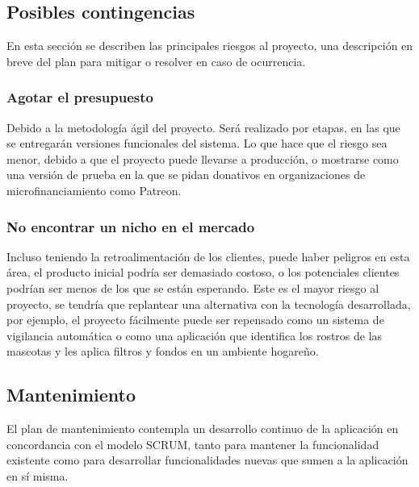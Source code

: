 \subsection{Posibles contingencias}

En esta sección se describen las principales riesgos al proyecto, una descripción en breve del plan para mitigar o resolver en caso de ocurrencia.

\subsubsection{Agotar el presupuesto}

Debido a la metodología ágil del proyecto. Será realizado por etapas, en las que se entregarán versiones funcionales del sistema. Lo que hace que el riesgo sea menor, debido a que el proyecto puede llevarse a producción, o mostrarse como una versión de prueba en la que se pidan donativos en organizaciones de microfinanciamiento como Patreon.


\subsubsection{No encontrar un nicho en el mercado}

Incluso teniendo la retroalimentación de los clientes, puede haber peligros en esta área, el producto inicial podría ser demasiado costoso, o los potenciales clientes podrían ser menos de los que se están esperando. Este es el mayor riesgo al proyecto, se tendría que replantear una alternativa con la tecnología desarrollada, por ejemplo, el proyecto fácilmente puede ser repensado como un sistema de vigilancia automática o como una aplicación que identifica los rostros de las mascotas y les aplica filtros y fondos en un ambiente hogareño.



\subsection{Mantenimiento}

El plan de mantenimiento contempla un desarrollo continuo de la aplicación en concordancia con el modelo SCRUM, tanto para mantener la funcionalidad existente como para desarrollar funcionalidades nuevas que sumen a la aplicación en sí misma.
